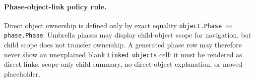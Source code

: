 \paragraph{Phase-object-link policy rule.} Direct object ownership is defined only by exact equality \texttt{object.Phase == phase.Phase}. Umbrella phases may display child-object scope for navigation, but child scope does not transfer ownership. A generated phase row may therefore never show an unexplained blank \texttt{Linked objects} cell: it must be rendered as direct links, scope-only child summary, no-direct-object explanation, or moved placeholder.

